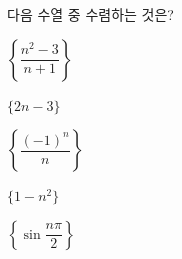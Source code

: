 다음 수열 중 수렴하는 것은?
\begin{choices32}{\rule[-3ex]{0pt}{8ex}$\left\{\dfrac{n^2-3}{n+1}\right\}$}{\rule[-3ex]{0pt}{8ex}$\{2n-3\}$}{\rule[-3ex]{0pt}{8ex}$\left\{\dfrac{(-1)^n}{n}\right\}$}{\rule[-3ex]{0pt}{8ex}$\{1-n^2\}$}{\rule[-3ex]{0pt}{8ex}$\left\{\sin\dfrac{n\pi}{2}\right\}$}\end{choices32}
